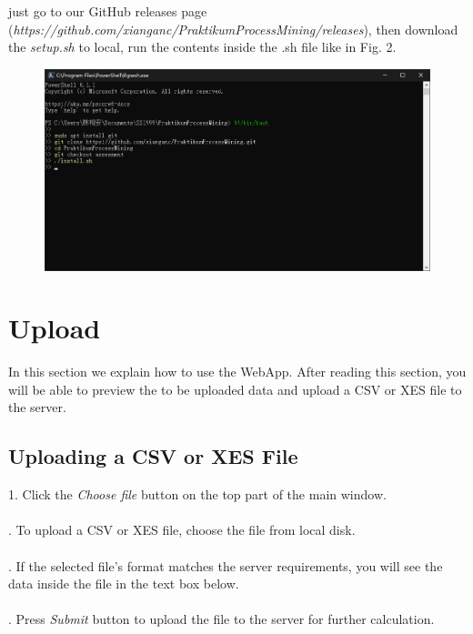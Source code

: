 \documentclass[runningheads]{llncs}
\begin{document}
just go to our GitHub releases page (\textit{https://github.com/xianganc/PraktikumProcessMining/releases}), then download the \textit{setup.sh} to local, run the contents inside the .sh file like in Fig. 2.

\begin{figure}[h]	
	\centering
	\includegraphics[scale=0.3]{setup.png}
	\caption{}
	\label{fig:label}
\end{figure}

\section{Upload}

In this section we explain how to use the WebApp. After reading this section, you will be able to preview the to be uploaded data and upload a CSV or XES file to the server.

\subsection{Uploading a CSV or XES File}

1. Click the \textit{Choose file} button on the top part of the main window.\\\\
. To upload a CSV or XES file, choose the file from local disk.\\\\
. If the selected file's format matches the server requirements, you will see the data inside the file in the text box below.\\\\
. Press \textit{Submit} button to upload the file to the server for further calculation.
\end{document}
